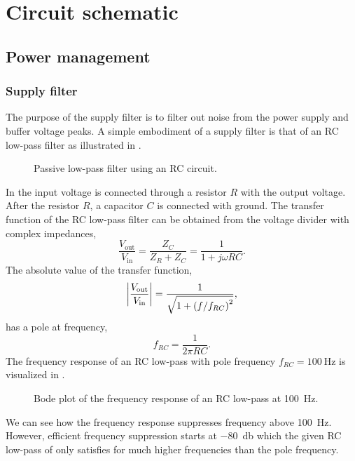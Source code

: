 \section{Circuit schematic}

\subsection{Power management}

\subsubsection{Supply filter}

The purpose of the supply filter is to filter out noise from the power supply and buffer voltage peaks.
A simple embodiment of a supply filter is that of an RC low-pass filter as illustrated in .
\begin{figure}[H]
	\centering
	
	\caption{Passive low-pass filter using an RC circuit.}\label{fig:filter_lowpass}
\end{figure}
In  the input voltage is connected through a resistor $R$ with the output voltage.
After the resistor $R$, a capacitor $C$ is connected with ground.
The transfer function of the RC low-pass filter can be obtained from the voltage divider with complex impedances,
\begin{equation}
	\frac{V_\text{out}}{V_\text{in}}
	=\frac{Z_C}{Z_R+Z_C}
	=\frac{1}{1+j\omega RC}.
	\label{eq:transfer_filter_rc}
\end{equation}
The absolute value of the transfer function,
\begin{equation}
	\abs{\frac{V_\text{out}}{V_\text{in}}}
	=\frac{1}{\sqrt{1+\left(f/f_{RC}\right)^2}},
\end{equation}
has a pole at frequency,
\begin{equation}
	f_{RC}=\frac{1}{2\pi RC}.
\end{equation}
The frequency response of an RC low-pass with pole frequency $f_{RC}=\SI{100}{\hertz}$ is visualized in .
\begin{figure}[H]
	\centering
	
	\caption{Bode plot of the frequency response of an RC low-pass at \SI{100}{\hertz}.}\label{fig:bode_filter_rc}
\end{figure}
We can see how the frequency response suppresses frequency above \SI{100}{\hertz}.
However, efficient frequency suppression starts at \SI{-80}{\decibel} which the given RC low-pass of  only satisfies for much higher frequencies than the pole frequency.

